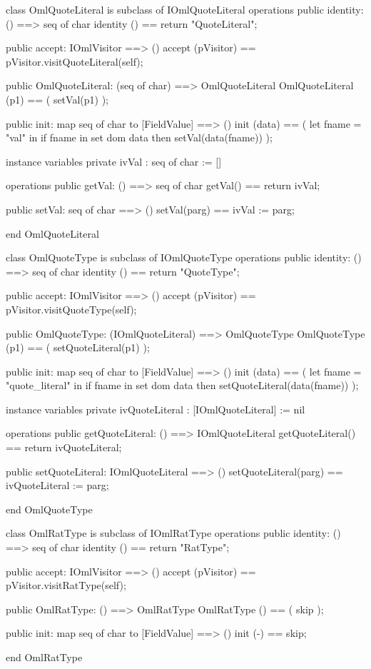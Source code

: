 \begin{vdm_al}
class OmlQuoteLiteral is subclass of IOmlQuoteLiteral
operations
  public identity: () ==> seq of char
  identity () == return "QuoteLiteral";

  public accept: IOmlVisitor ==> ()
  accept (pVisitor) == pVisitor.visitQuoteLiteral(self);

  public OmlQuoteLiteral:
      (seq of char) ==> OmlQuoteLiteral
  OmlQuoteLiteral (p1) == 
   ( setVal(p1) );

  public init: map seq of char to [FieldValue] ==> ()
  init (data) ==
    ( let fname = "val" in
        if fname in set dom data
        then setVal(data(fname)) );

instance variables
  private ivVal : seq of char := []

operations
  public getVal: () ==> seq of char
  getVal() == return ivVal;

  public setVal: seq of char ==> ()
  setVal(parg) == ivVal := parg;

end OmlQuoteLiteral
\end{vdm_al}

\begin{vdm_al}
class OmlQuoteType is subclass of IOmlQuoteType
operations
  public identity: () ==> seq of char
  identity () == return "QuoteType";

  public accept: IOmlVisitor ==> ()
  accept (pVisitor) == pVisitor.visitQuoteType(self);

  public OmlQuoteType:
      (IOmlQuoteLiteral) ==> OmlQuoteType
  OmlQuoteType (p1) == 
   ( setQuoteLiteral(p1) );

  public init: map seq of char to [FieldValue] ==> ()
  init (data) ==
    ( let fname = "quote_literal" in
        if fname in set dom data
        then setQuoteLiteral(data(fname)) );

instance variables
  private ivQuoteLiteral : [IOmlQuoteLiteral] := nil

operations
  public getQuoteLiteral: () ==> IOmlQuoteLiteral
  getQuoteLiteral() == return ivQuoteLiteral;

  public setQuoteLiteral: IOmlQuoteLiteral ==> ()
  setQuoteLiteral(parg) == ivQuoteLiteral := parg;

end OmlQuoteType
\end{vdm_al}

\begin{vdm_al}
class OmlRatType is subclass of IOmlRatType
operations
  public identity: () ==> seq of char
  identity () == return "RatType";

  public accept: IOmlVisitor ==> ()
  accept (pVisitor) == pVisitor.visitRatType(self);

  public OmlRatType:
      () ==> OmlRatType
  OmlRatType () == 
    ( skip );

  public init: map seq of char to [FieldValue] ==> ()
  init (-) == skip;

end OmlRatType
\end{vdm_al}

